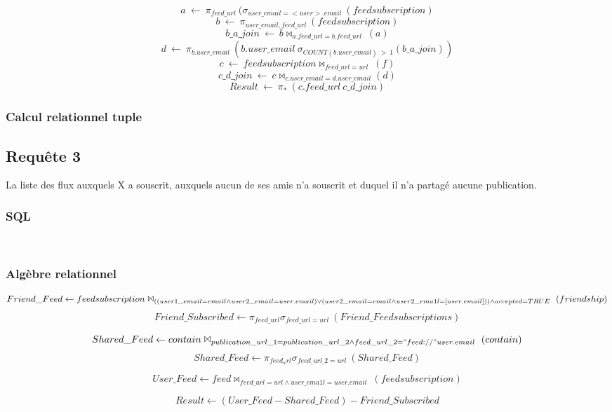 \documentclass[a4paper,10pt]{article}
\begin{document}
$$a\ \leftarrow\ \pi_{feed\_url}\ (\sigma_{user\_email=<user>.email}\ (feedsubscription)$$
$$b\ \leftarrow\ \pi_{user\_email, feed\_url}\ (feedsubscription)$$
$$b\_a\_join\ \leftarrow\ b \Join_{a.feed\_url=b.feed\_url}\ (a)$$
$$d\ \leftarrow\ \pi_{b.user\_email}\ (b.user\_email\ \sigma_{COUNT(b.user\_email)\ >\ 1} (b\_a\_join))$$
$$c\ \leftarrow\ feedsubscription \Join_{feed\_url=url}\ (f)$$
$$c\_d\_join\ \leftarrow\ c \Join_{c.user\_email=d.user\_email} (d)$$
$$Result\ \leftarrow\ \pi_*\ (c.feed\_url\ c\_d\_join)$$

\subsubsection{Calcul relationnel tuple}
\clearpage
\subsection{Requête 3}
La liste des flux auxquels X a souscrit, auxquels aucun de ses amis n’a souscrit et duquel il n’a partagé
aucune publication.
\subsubsection{SQL}

\begin{lstlisting}


\end{lstlisting}
\subsubsection{Algèbre relationnel}

$$Friend\_Feed \leftarrow feedsubscription \Join_{((user1\_email=email \wedge user2\_email={user.email}) \vee \\ (user2\_email=email \wedge user2\_ema1l=[user.email])) \wedge accepted=TRUE}\ (friendship)$$
$$Friend\_Subscribed \leftarrow \pi_{feed\_url} \sigma_{feed\_url=url}\ (Friend\_Feedsubscriptions)$$

$$Shared\_Feed \leftarrow contain \Join_{publication\_url\_1=publication\_url\_2 \wedge feed\_url\_2 = "feed://"{user.email}}\ (contain)$$
$$Shared\_Feed \leftarrow \pi_{feed_url} \sigma_{feed\_url\_2=url}\ (Shared\_Feed)$$

$$User\_Feed \leftarrow feed \Join_{feed\_url=url \wedge user\_ema1l={user.email}}\ (feedsubscription)$$

$$Result \leftarrow (User\_Feed - Shared\_Feed) - Friend\_Subscribed$$
\end{document}
